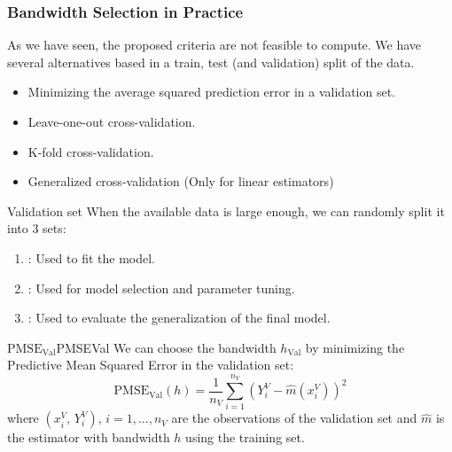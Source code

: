 \subsubsection{Bandwidth Selection in Practice}
As we have seen, the proposed criteria are not feasible to compute. We have several
alternatives based in a train, test (and validation) split of the data.
\begin{itemize}
	\item Minimizing the average squared prediction error in a validation set.
	\item Leave-one-out cross-validation.
	\item K-fold cross-validation.
	\item Generalized cross-validation (Only for linear estimators)
\end{itemize}

\begin{definition}{Validation set}{}
	When the available data is large enough, we can randomly split it into
	3 sets:
	\begin{enumerate}
		\item {}: Used to fit the model.
		\item {}: Used for model selection and parameter tuning.
		\item {}: Used to evaluate the generalization of the final model.
	\end{enumerate}
\end{definition}

\begin{definition}{$\text{PMSE}_\text{Val}$}{PMSEVal}
	We can choose the bandwidth $h_\text{Val}$ by minimizing the
	Predictive Mean Squared Error in the validation set:
	\begin{equation*}
		\text{PMSE}_\text{Val}(h) = \frac{1}{n_V} \sum_{i=1}^{n_V} \left( Y_i^V - \hat m(x_i^V) \right)^2
	\end{equation*}
	where $(x_i^V,\, Y_i^V),\,i=1,\ldots,n_V$ are the observations of the validation set and
	$\hat m$ is the estimator with bandwidth $h$ using the training set.
\end{definition}

